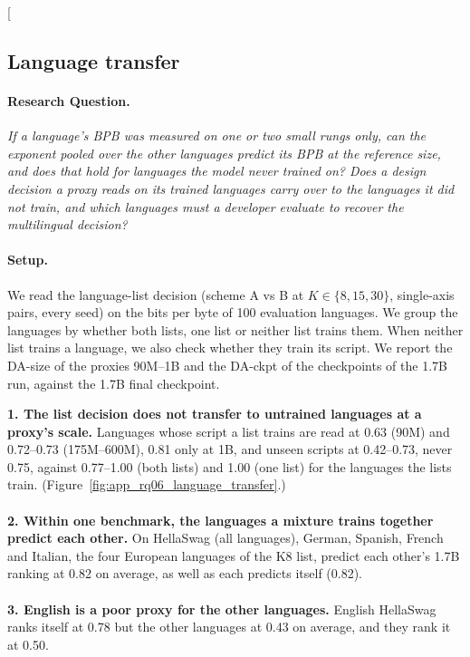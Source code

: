\clearpage
\twocolumn[{%
\subsection{Language transfer}
\label{app:rq06_language_transfer}

\noindent\begin{minipage}[t]{0.485\textwidth}
\vspace{0pt}
\paragraph{Research Question.} \emph{If a language's BPB was measured on one or two small rungs only, can the exponent pooled over the other languages predict its BPB at the reference size, and does that hold for languages the model never trained on? Does a design decision a proxy reads on its trained languages carry over to the languages it did not train, and which languages must a developer evaluate to recover the multilingual decision?}

\paragraph{Setup.} We read the language-list decision (scheme A vs B at $K \in \{8, 15, 30\}$, single-axis pairs, every seed) on the bits per byte of 100 evaluation languages. We group the languages by whether both lists, one list or neither list trains them. When neither list trains a language, we also check whether they train its script. We report the DA-size of the proxies 90M--1B and the DA-ckpt of the checkpoints of the 1.7B run, against the 1.7B final checkpoint.
\end{minipage}\hfill
\begin{minipage}[t]{0.485\textwidth}
\vspace{0pt}
\begin{rqfinding}
\textbf{1. The list decision does not transfer to untrained languages at a proxy's scale.} Languages whose script a list trains are read at 0.63 (90M) and 0.72--0.73 (175M--600M), 0.81 only at 1B, and unseen scripts at 0.42--0.73, never 0.75, against 0.77--1.00 (both lists) and 1.00 (one list) for the languages the lists train. (Figure~\ref{fig:app_rq06_language_transfer}.)
\\
\\
\textbf{2. Within one benchmark, the languages a mixture trains together predict each other.} On HellaSwag (all languages), German, Spanish, French and Italian, the four European languages of the K8 list, predict each other's 1.7B ranking at 0.82 on average, as well as each predicts itself (0.82).
\\
\\
\textbf{3. English is a poor proxy for the other languages.} English HellaSwag ranks itself at 0.78 but the other languages at 0.43 on average, and they rank it at 0.50.
\end{rqfinding}
\end{minipage}

}
